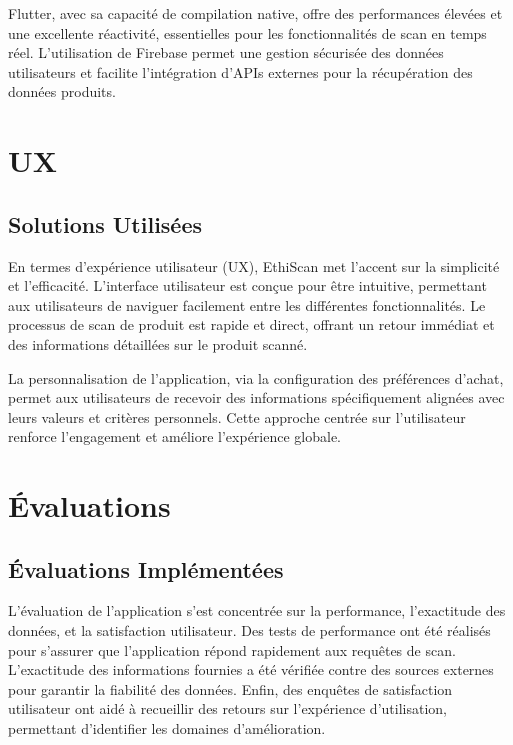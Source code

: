 \documentclass[11pt]{article}
\begin{document}
Flutter, avec sa capacité de compilation native, offre des performances élevées et une excellente réactivité, essentielles pour les fonctionnalités de scan en temps réel. L'utilisation de Firebase permet une gestion sécurisée des données utilisateurs et facilite l'intégration d'APIs externes pour la récupération des données produits.


\section{UX}

\subsection{Solutions Utilisées}

En termes d'expérience utilisateur (UX), EthiScan met l'accent sur la simplicité et l'efficacité. L'interface utilisateur est conçue pour être intuitive, permettant aux utilisateurs de naviguer facilement entre les différentes fonctionnalités. Le processus de scan de produit est rapide et direct, offrant un retour immédiat et des informations détaillées sur le produit scanné.

La personnalisation de l'application, via la configuration des préférences d'achat, permet aux utilisateurs de recevoir des informations spécifiquement alignées avec leurs valeurs et critères personnels. Cette approche centrée sur l'utilisateur renforce l'engagement et améliore l'expérience globale.


\section{Évaluations}

\subsection{Évaluations Implémentées}

L'évaluation de l'application s'est concentrée sur la performance, l'exactitude des données, et la satisfaction utilisateur. Des tests de performance ont été réalisés pour s'assurer que l'application répond rapidement aux requêtes de scan. L'exactitude des informations fournies a été vérifiée contre des sources externes pour garantir la fiabilité des données. Enfin, des enquêtes de satisfaction utilisateur ont aidé à recueillir des retours sur l'expérience d'utilisation, permettant d'identifier les domaines d'amélioration.
\end{document}
